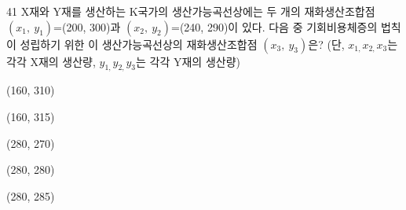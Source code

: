 \begin{question}{41}
X재와 Y재를 생산하는 K국가의 생산가능곡선상에는 두 개의 재화생산조합점 \\
$(x_{ 1 } ,~ y_{ 1 } )$=(200, 300)과 $(x_{ 2 } ,~ y_{ 2 } )$=(240, 290)이 있다. 다음 중 기회비용체증의 법칙이 성립하기 위한 이 생산가능곡선상의 재화생산조합점 $(x_{ 3 } ,~y_{ 3 } )$은? (단, $x_{ 1, } x_{ 2, } x_{ 3 }$는 각각 X재의 생산량, $y_{ 1, } y_{ 2, } y_{ 3 }$는 각각 Y재의 생산량)
\begin{choices}
  \item (160, 310)
  \item (160, 315)
  \item (280, 270)
  \item (280, 280)
  \item (280, 285)
\end{choices}
\end{question}
